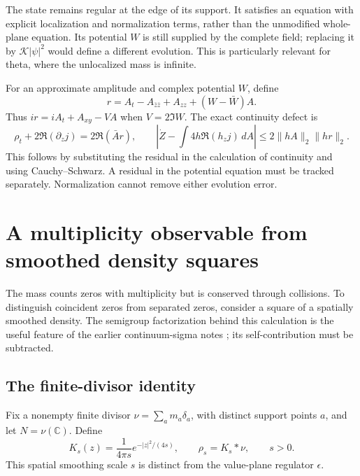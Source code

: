\documentclass[11pt]{article}
\newcommand{\C}{\mathbb C}
\newcommand{\dd}{\,d}
\newcommand{\eps}{\epsilon}
\theoremstyle{definition}
\theoremstyle{remark}
\begin{document}
The state remains regular at the edge of its support. It satisfies an
equation with explicit localization and normalization terms, rather than
the unmodified whole-plane equation. Its potential $W$ is still supplied
by the complete field; replacing it by $\mathcal K|\psi|^2$ would define a
different evolution. This is particularly relevant for theta, where
the unlocalized mass is infinite.

For an approximate amplitude and complex potential $W$, define
\begin{equation}
 r=A_t-A_{\bar z\bar z}+A_{zz}+(W-\bar W)A.
\end{equation}
Thus $ir=iA_t+A_{xy}-VA$ when $V=2\Im W$.
The exact continuity defect is
\begin{equation}
 \rho_t+2\Re(\partial_z j)=2\Re(\bar A r),\qquad
 \left|\dot Z-\int4h\Re(h_zj)\dd A\right|
 \le2\|hA\|_2\|hr\|_2.
 \label{eq:residual}
\end{equation}
This follows by substituting the residual in the calculation of
continuity and using Cauchy--Schwarz. A residual in the potential
equation must be tracked separately. Normalization cannot remove
either evolution error.

\section{A multiplicity observable from smoothed density squares}
\label{sec:observable}

The mass counts zeros with multiplicity but is conserved through
collisions. To distinguish coincident zeros from separated zeros,
consider a square of a spatially smoothed density. The semigroup
factorization behind this calculation is the useful feature of the
earlier continuum-sigma notes \cite{BakerSigma}; its self-contribution
must be subtracted.

\subsection{The finite-divisor identity}

Fix a nonempty finite divisor $\nu=\sum_a m_a\delta_a$, with distinct support
points $a$, and let $N=\nu(\C)$. Define
\begin{equation}
 K_s(z)=\frac1{4\pi s}e^{-|z|^2/(4s)},\qquad
 \rho_s=K_s*\nu,\qquad s>0.
 \label{eq:spatialkernel}
\end{equation}
This spatial smoothing scale $s$ is distinct from the value-plane
regulator $\eps$.
\end{document}
